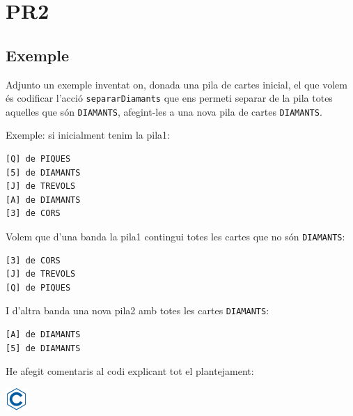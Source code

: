 \documentclass[]{book}
\begin{document}
\chapter{PR2}\label{pr2}

\section{Exemple}\label{exemple-1}

Adjunto un exemple inventat on, donada una pila de cartes inicial, el
que volem és codificar l'acció \texttt{separarDiamants} que ens permeti
separar de la pila totes aquelles que són \texttt{DIAMANTS}, afegint-les
a una nova pila de cartes \texttt{DIAMANTS}.

Exemple: si inicialment tenim la pila1:

\begin{verbatim}
[Q] de PIQUES
[5] de DIAMANTS
[J] de TREVOLS
[A] de DIAMANTS
[3] de CORS
\end{verbatim}

Volem que d'una banda la pila1 contingui totes les cartes que no són
\texttt{DIAMANTS}:

\begin{verbatim}
[3] de CORS
[J] de TREVOLS
[Q] de PIQUES
\end{verbatim}

I d'altra banda una nova pila2 amb totes les cartes \texttt{DIAMANTS}:

\begin{verbatim}
[A] de DIAMANTS
[5] de DIAMANTS
\end{verbatim}

He afegit comentaris al codi explicant tot el plantejament:

\includegraphics{./img/c.png}
\end{document}

